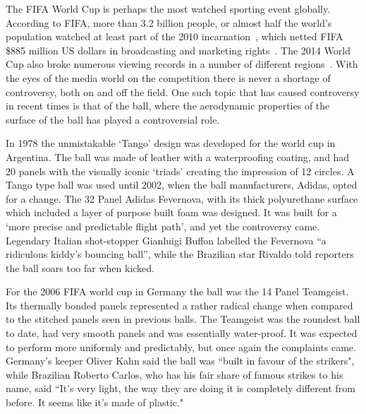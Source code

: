 \documentclass[a4paper]{article}
\begin{document}
The FIFA World Cup is perhaps the most watched sporting event globally.  According to FIFA, more than 3.2 billion people, or almost half the world's  population watched at least part of the 2010 incarnation~\cite{fifa-figures}, which netted FIFA \$885 million US dollars in broadcasting and marketing rights~\cite{fifa-report}.  The 2014 World Cup also broke numerous viewing records in a number of different regions~\cite{fifa-report-brasil}.  With the eyes of the media world on the competition there is never a shortage of controversy, both on and off the field.  One such topic that has caused controversy in recent times is that of the ball, where the aerodynamic properties of the surface of the ball has played a controversial role. 

In 1978 the unmistakable `Tango' design was developed for the world cup in Argentina.  The ball was made of leather with a waterproofing coating, and had 20 panels with the visually iconic `triads' creating the impression of 12 circles.  A Tango type ball was used until 2002, when the ball manufacturers, Adidas, opted for a change.  The 32 Panel Adidas Fevernova, with its thick polyurethane surface which included a layer of purpose built foam was designed.  It was built for a `more precise and predictable flight path', and yet the controversy came.  Legendary Italian shot-stopper Gianluigi Buffon labelled the Fevernova ``a ridiculous kiddy's bouncing ball'', while the Brazilian star Rivaldo told reporters the ball soars too far when kicked.

For the 2006 FIFA world cup in Germany the ball was the 14 Panel Teamgeist.  Its thermally bonded panels represented a rather radical change when compared to the stitched panels seen in previous balls.  The Teamgeist was the roundest ball to date, had very smooth panels and was essentially water-proof.  It was expected to perform more uniformly and predictably, but once again the complaints came.  Germany's keeper Oliver Kahn said the ball was ``built in favour of the strikers", while Brazilian Roberto Carlos, who has his fair share of famous strikes to his name, said ``It's very light, the way they are doing it is completely different from before. It seems like it's made of plastic."
\end{document}

